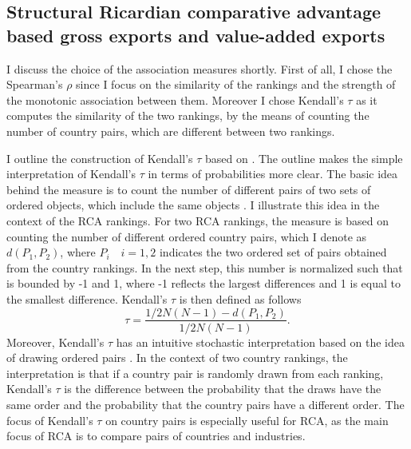 \subsection{Structural Ricardian comparative advantage based gross exports and value-added exports}
I discuss the choice of the association measures shortly.
First of all, I chose the Spearman's $\rho$  since I focus on the similarity of the rankings and the strength of the monotonic association between them.
Moreover I chose Kendall's $\tau$ as it computes the similarity of the two rankings, by the means of counting the number of country pairs, which are different between two rankings.%
\par
I outline the construction of Kendall's $\tau$ based on \textcite{abdi2007kendall}.
The outline makes the simple interpretation of Kendall's $\tau$ in terms of probabilities more clear.
The basic idea behind the measure is to count the number of different pairs of two sets of ordered  objects, which include the same objects  \textcite{abdi2007kendall}.
I illustrate this idea in the context of the RCA rankings.
For two RCA rankings, the measure is based on counting the number of different ordered country pairs, which I denote as $d(P_1, P_2)$, where $P_i \quad i=1,2$ indicates the two ordered set of pairs obtained from the country rankings.
In the next step, this number is normalized such that is bounded by -1 and 1, where -1 reflects the largest differences and 1 is equal to the smallest difference.
Kendall's $\tau$ is then defined as follows \[ \tau= \frac{1/2 N(N-1) - d(P_1,P_2)} {1/2 N(N-1)} .\] %
Moreover, Kendall's $\tau$ has an intuitive stochastic interpretation based on the idea of drawing ordered pairs \parencite{abdi2007kendall}.
In the context of two country rankings, the interpretation is that if a country pair is randomly drawn from each ranking, Kendall's $\tau$ is the difference between the probability that the draws have the same order and the probability that the country pairs have a different order.
The focus of Kendall's $\tau$ on country pairs is especially useful for RCA, as the main focus of RCA is to compare pairs of countries and industries.   \par
